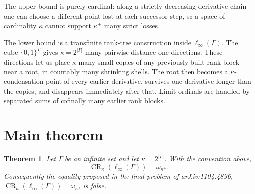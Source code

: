\documentclass[11pt]{article}
\newtheorem{theorem}{Theorem}
\newcommand{\card}[1]{\left|#1\right|}
\newcommand{\CR}{\operatorname{CR}}
\begin{document}
The upper bound is purely cardinal: along a strictly decreasing derivative
chain one can choose a different point lost at each successor step, so a space
of cardinality \(\kappa\) cannot support \(\kappa^+\) many strict losses.

The lower bound is a transfinite rank-tree construction inside
\(\ell_\infty(\Gamma)\).  The cube \(\{0,1\}^{\Gamma}\) gives
\(\kappa=2^{\card{\Gamma}}\) many pairwise distance-one directions.  These
directions let us place \(\kappa\) many small copies of any previously built
rank block near a root, in countably many shrinking shells.  The root then
becomes a \(\kappa\)-condensation point of every earlier derivative, survives
one derivative longer than the copies, and disappears immediately after that.
Limit ordinals are handled by separated sums of cofinally many earlier rank
blocks.

\section*{Main theorem}

\begin{theorem}
Let \(\Gamma\) be an infinite set and let
\(\kappa=2^{\card{\Gamma}}\).  With the convention above,
\[
\CR_\kappa(\ell_\infty(\Gamma))=\omega_{\kappa^+}.
\]
Consequently the equality proposed in the final problem of arXiv:1104.4896,
\(\CR_\kappa(\ell_\infty(\Gamma))=\omega_\kappa\), is false.
\end{theorem}
\end{document}

